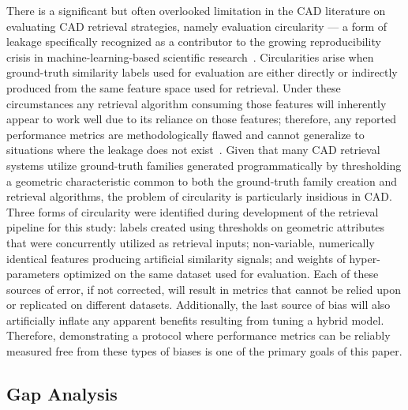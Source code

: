 \documentclass[preprint,12pt]{elsarticle}
\begin{document}
There is a significant but often overlooked limitation in the CAD literature on evaluating CAD retrieval strategies, namely evaluation circularity --- a form of leakage specifically recognized as a contributor to the growing reproducibility crisis in machine-learning-based scientific research~\cite{Kapoor2023}.
Circularities arise when ground-truth similarity labels used for evaluation are either directly or indirectly produced from the same feature space used for retrieval.
Under these circumstances any retrieval algorithm consuming those features will inherently appear to work well due to its reliance on those features; therefore, any reported performance metrics are methodologically flawed and cannot generalize to situations where the leakage does not exist~\cite{Apicella2025}.
Given that many CAD retrieval systems utilize ground-truth families generated programmatically by thresholding a geometric characteristic common to both the ground-truth family creation and retrieval algorithms, the problem of circularity is particularly insidious in CAD.
Three forms of circularity were identified during development of the retrieval pipeline for this study: labels created using thresholds on geometric attributes that were concurrently utilized as retrieval inputs; non-variable, numerically identical features producing artificial similarity signals; and weights of hyper-parameters optimized on the same dataset used for evaluation.
Each of these sources of error, if not corrected, will result in metrics that cannot be relied upon or replicated on different datasets.
Additionally, the last source of bias will also artificially inflate any apparent benefits resulting from tuning a hybrid model.
Therefore, demonstrating a protocol where performance metrics can be reliably measured free from these types of biases is one of the primary goals of this paper.

\subsection{Gap Analysis}
\end{document}
